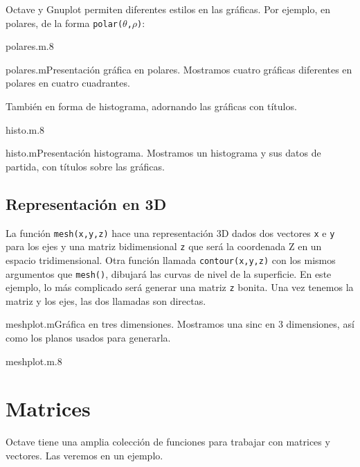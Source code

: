 Octave  y Gnuplot  permiten diferentes  estilos en  las gráficas.  Por
ejemplo, en polares, de la forma {\tt polar($\theta$,$\rho$)}:

\begin{figura}{polares.m}{.8}
\caption{Diagramas en coordenadas polares}
\end{figura}

\begin{ejemplo}{polares.m}{Presentación gráfica en polares.}
Mostramos cuatro gráficas diferentes en polares en cuatro cuadrantes.
\end{ejemplo}

También en forma de histograma, adornando las gráficas con títulos.

\begin{figura}{histo.m}{.8}
\caption{Representación de histogramas}
\end{figura}

\begin{ejemplo}{histo.m}{Presentación   histograma.}    Mostramos   un
histograma y  sus datos  de partida, con  títulos sobre  las gráficas.
\end{ejemplo}

\subsection*{Representación en 3D}

La  función {\tt  mesh(x,y,z)} hace  una representación  3D dados  dos
vectores {\tt  x} e {\tt y}  para los ejes y  una matriz bidimensional
{\tt z}  que será la coordenada  Z en un espacio  tridimensional. Otra
función  llamada {\tt  contour(x,y,z)} con  los mismos  argumentos que
{\tt mesh()}, dibujará  las curvas de nivel de la  superficie. En este
ejemplo, lo más complicado será generar una matriz {\tt z} bonita. Una
vez tenemos la matriz y los ejes, las dos llamadas son directas.

\begin{ejemplo}{meshplot.m}{Gráfica  en  tres dimensiones.}  Mostramos
una sinc en 3 dimensiones, así  como los planos usados para generarla.
\end{ejemplo}

\begin{figura}{meshplot.m}{.8}
\caption{Gráficas en tres dimensiones}
\end{figura}

\section{Matrices}
Octave  tiene una  amplia  colección de  funciones  para trabajar  con
matrices y vectores. Las veremos en un ejemplo.

